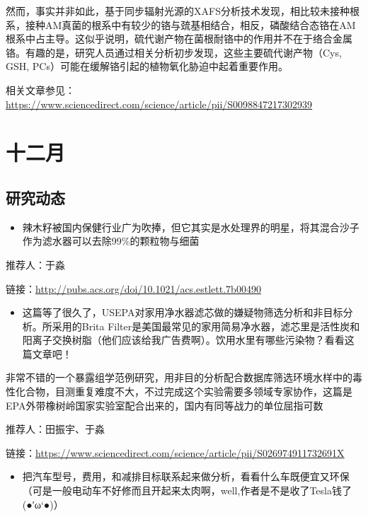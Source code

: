 \documentclass[]{book}
\providecommand{\tightlist}{%
  \setlength{\itemsep}{0pt}\setlength{\parskip}{0pt}}
\begin{document}
然而，事实并非如此，基于同步辐射光源的XAFS分析技术发现，相比较未接种根系，接种AM真菌的根系中有较少的铬与巯基相结合，相反，磷酸结合态铬在AM根系中占主导。这似乎说明，硫代谢产物在菌根耐铬中的作用并不在于络合金属铬。有趣的是，研究人员通过相关分析初步发现，这些主要硫代谢产物（Cys,
GSH, PCs）可能在缓解铬引起的植物氧化胁迫中起着重要作用。

相关文章参见：\url{https://www.sciencedirect.com/science/article/pii/S0098847217302939}

\section*{十二月}

\subsection*{研究动态}\label{-1}

\begin{itemize}
\tightlist
\item
  辣木籽被国内保健行业广为吹捧，但它其实是水处理界的明星，将其混合沙子作为滤水器可以去除99\%的颗粒物与细菌
\end{itemize}

推荐人：于淼

链接：\url{http://pubs.acs.org/doi/10.1021/acs.estlett.7b00490}

\begin{itemize}
\tightlist
\item
  这篇等了很久了，USEPA对家用净水器滤芯做的嫌疑物筛选分析和非目标分析。所采用的Brita
  Filter是美国最常见的家用简易净水器，滤芯里是活性炭和阳离子交换树脂（他们应该给我广告费啊）。饮用水里有哪些污染物？看看这篇文章吧！
\end{itemize}

非常不错的一个暴露组学范例研究，用非目的分析配合数据库筛选环境水样中的毒性化合物，目测重复难度不大，不过完成这个实验需要多领域专家协作，这篇是EPA外带橡树岭国家实验室配合出来的，国内有同等战力的单位屈指可数

推荐人：田振宇、于淼

链接：\url{https://www.sciencedirect.com/science/article/pii/S026974911732691X}

\begin{itemize}
\tightlist
\item
  把汽车型号，费用，和减排目标联系起来做分析，看看什么车既便宜又环保（可是一般电动车不好修而且开起来太肉啊，well,作者是不是收了Tesla钱了
  (●′ω`●)）
\end{itemize}
\end{document}
